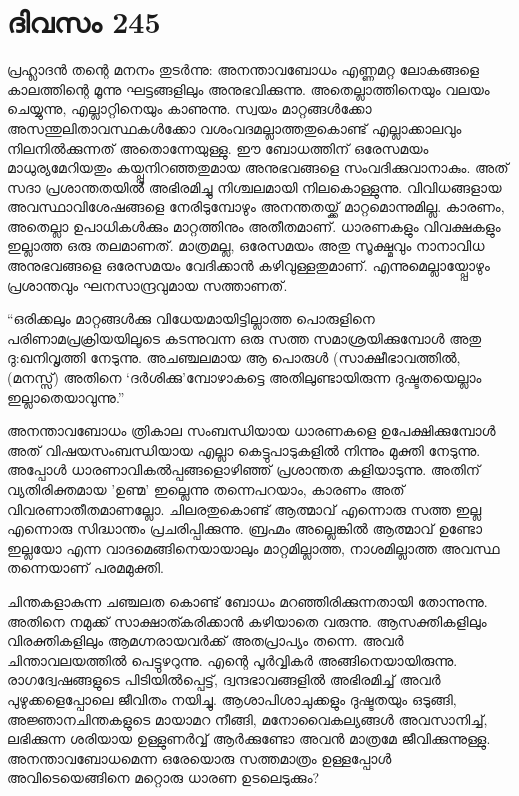 \section{ദിവസം 245}


പ്രഹ്ലാദന്‍ തന്റെ മനനം തുടര്‍ന്നു: അനന്താവബോധം എണ്ണമറ്റ  ലോകങ്ങളെ കാലത്തിന്റെ മൂന്നു ഘട്ടങ്ങളിലും അനുഭവിക്കുന്നു. അതെല്ലാത്തിനെയും വലയം ചെയ്യുന്നു, എല്ലാറ്റിനെയും കാണുന്നു. സ്വയം മാറ്റങ്ങള്‍ക്കോ അസന്തുലിതാവസ്ഥകള്‍ക്കോ വശംവദമല്ലാത്തതുകൊണ്ട് എല്ലാക്കാലവും നിലനില്‍ക്കുന്നത് അതൊന്നേയുള്ളു. ഈ ബോധത്തിന് ഒരേസമയം മാധുര്യമേറിയതും കയ്പ്പുനിറഞ്ഞതുമായ അനുഭവങ്ങളെ സംവദിക്കുവാനാകും. അത് സദാ പ്രശാന്തതയില്‍ അഭിരമിച്ചു നിശ്ചലമായി നിലകൊള്ളുന്നു. വിവിധങ്ങളായ അവസ്ഥാവിശേഷങ്ങളെ നേരിടുമ്പോഴും അനന്തതയ്ക്ക് മാറ്റമൊന്നുമില്ല. കാരണം, അതെല്ലാ ഉപാധികള്‍ക്കും മാറ്റത്തിനും അതീതമാണ്. ധാരണകളും വിവക്ഷകളും ഇല്ലാത്ത ഒരു തലമാണത്. മാത്രമല്ല, ഒരേസമയം അതു സൂക്ഷ്മവും നാനാവിധ അനുഭവങ്ങളെ ഒരേസമയം വേദിക്കാന്‍ കഴിവുള്ളതുമാണ്. എന്നുമെല്ലായ്പ്പോഴും പ്രശാന്തവും ഘനസാന്ദ്രവുമായ സത്താണത്.
  
“ഒരിക്കലും മാറ്റങ്ങള്‍ക്കു വിധേയമായിട്ടില്ലാത്ത പൊരുളിനെ പരിണാമപ്രക്രിയയിലൂടെ കടന്നുവന്ന ഒരു സത്ത സമാശ്രയിക്കുമ്പോള്‍ അതു ദു:ഖനിവൃത്തി നേടുന്നു. അചഞ്ചലമായ ആ പൊരുള്‍ (സാക്ഷീഭാവത്തില്‍, (മനസ്സ്) അതിനെ ‘ദര്‍ശിക്കു’മ്പോഴാകട്ടെ അതിലുണ്ടായിരുന്ന ദുഷ്ടതയെല്ലാം ഇല്ലാതെയാവുന്നു.” 

അനന്താവബോധം ത്രികാല സംബന്ധിയായ ധാരണകളെ ഉപേക്ഷിക്കുമ്പോള്‍ അത് വിഷയസംബന്ധിയായ എല്ലാ കെട്ടുപാടുകളില്‍ നിന്നും മുക്തി നേടുന്നു. അപ്പോള്‍ ധാരണാവികല്‍പ്പങ്ങളൊഴിഞ്ഞ് പ്രശാന്തത കളിയാടുന്നു. അതിന് വ്യതിരിക്തമായ 'ഉണ്മ' ഇല്ലെന്നു തന്നെപറയാം, കാരണം അത് വിവരണാതീതമാണല്ലോ. ചിലരതുകൊണ്ട് ആത്മാവ് എന്നൊരു സത്ത ഇല്ല എന്നൊരു സിദ്ധാന്തം പ്രചരിപ്പിക്കുന്നു. ബ്രഹ്മം അല്ലെങ്കില്‍ ആത്മാവ് ഉണ്ടോ ഇല്ലയോ എന്ന വാദമെങ്ങിനെയായാലും  മാറ്റമില്ലാത്ത, നാശമില്ലാത്ത അവസ്ഥ തന്നെയാണ് പരമമുക്തി.

ചിന്തകളാകുന്ന ചഞ്ചലത കൊണ്ട് ബോധം മറഞ്ഞിരിക്കുന്നതായി തോന്നുന്നു. അതിനെ നമുക്ക്‌ സാക്ഷാത്കരിക്കാന്‍ കഴിയാതെ വരുന്നു. ആസക്തികളിലും വിരക്തികളിലും ആമഗ്നരായവര്‍ക്ക് അതപ്രാപ്യം തന്നെ. അവര്‍ ചിന്താവലയത്തില്‍ പെട്ടുഴറുന്നു. എന്റെ പൂര്‍വ്വികര്‍ അങ്ങിനെയായിരുന്നു. രാഗദ്വേഷങ്ങളുടെ പിടിയില്‍പ്പെട്ട്, ദ്വന്ദഭാവങ്ങളില്‍ അഭിരമിച്ച് അവര്‍ പുഴുക്കളെപ്പോലെ ജീവിതം നയിച്ചു. ആശാപിശാചുക്കളും ദുഷ്ടതയും ഒടുങ്ങി, അജ്ഞാനചിന്തകളുടെ മായാമറ നീങ്ങി, മനോവൈകല്യങ്ങള്‍ അവസാനിച്ച്, ലഭിക്കുന്ന ശരിയായ ഉള്ളുണര്‍വ്വ് ആര്‍ക്കുണ്ടോ അവന്‍ മാത്രമേ ജീവിക്കുന്നുള്ളു. അനന്താവബോധമെന്ന ഒരേയൊരു സത്തമാത്രം ഉള്ളപ്പോള്‍ അവിടെയെങ്ങിനെ മറ്റൊരു ധാരണ ഉടലെടുക്കും?

